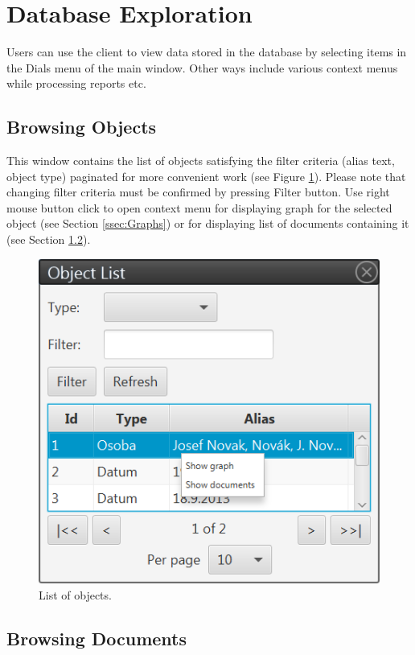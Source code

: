 \section{Database Exploration}
\label{ssec:ViewDatabase}

Users can use the client to view data stored in the database by selecting items
in the Dials menu of the main window. Other ways include various context menus
while processing reports etc.

\subsection{Browsing Objects}
\label{sssec:ObjectList}

This window contains the list of objects satisfying the filter criteria (alias text,
object type) paginated for more convenient work (see Figure
\ref{fig:ObjectList}). Please note that changing filter criteria must be confirmed by pressing Filter button. Use right mouse button click to open context menu for displaying graph for the selected object (see Section \ref{ssec:Graphs}) or for displaying list of documents containing it (see
Section \ref{sssec:DocumentList}).

\begin{figure}[!htb]
        \centering
        \includegraphics{Images/objectlist}
        \caption{List of objects.}
        \label{fig:ObjectList}
\end{figure}

\subsection{Browsing Documents}
\label{sssec:DocumentList}


